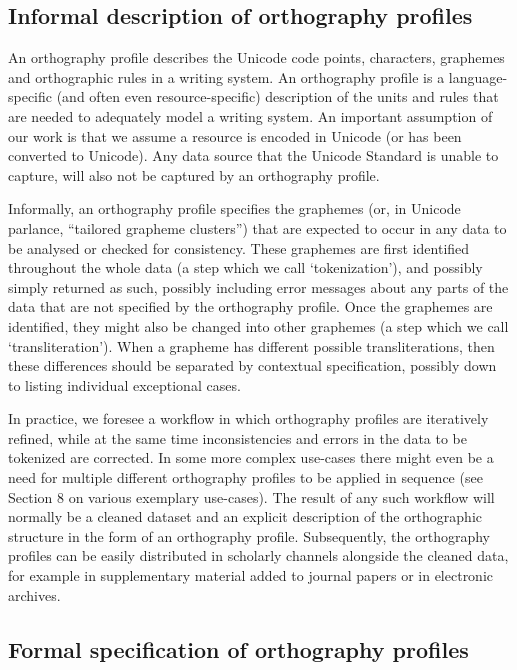 \subsection{Informal description of orthography profiles}\label{informal-description-of-orthography-profiles}

An orthography profile describes the Unicode code points, characters, graphemes and orthographic rules in a writing system. An orthography profile is a language-specific (and often even resource-specific) description of the units and rules that are needed to adequately model a writing system. An important assumption of our work is that we assume a resource is encoded in Unicode (or has been converted to Unicode). Any data source that the Unicode Standard is unable to capture, will also not be captured by an orthography profile.

Informally, an orthography profile specifies the graphemes (or, in Unicode parlance, ``tailored grapheme clusters'') that are expected to occur in any data to be analysed or checked for consistency. These graphemes are first identified throughout the whole data (a step which we call `tokenization'), and possibly simply returned as such, possibly including error messages about any parts of the data that are not specified by the orthography profile. Once the graphemes are identified, they might also be changed into other graphemes (a step which we call `transliteration'). When a grapheme has different possible transliterations, then these differences should be separated by contextual specification, possibly down to listing individual exceptional cases.

In practice, we foresee a workflow in which orthography profiles are iteratively refined, while at the same time inconsistencies and errors in the data to be tokenized are corrected. In some more complex use-cases there might even be a need for multiple different orthography profiles to be applied in sequence (see Section 8 on various exemplary use-cases). The result of any such workflow will normally be a cleaned dataset and an explicit description of the orthographic structure in the form of an orthography profile. Subsequently, the orthography profiles can be easily distributed in scholarly channels alongside the cleaned data, for example in supplementary material added to journal papers or in electronic archives.

\subsection{Formal specification of orthography profiles}\label{formal-specification-of-orthography-profiles}

